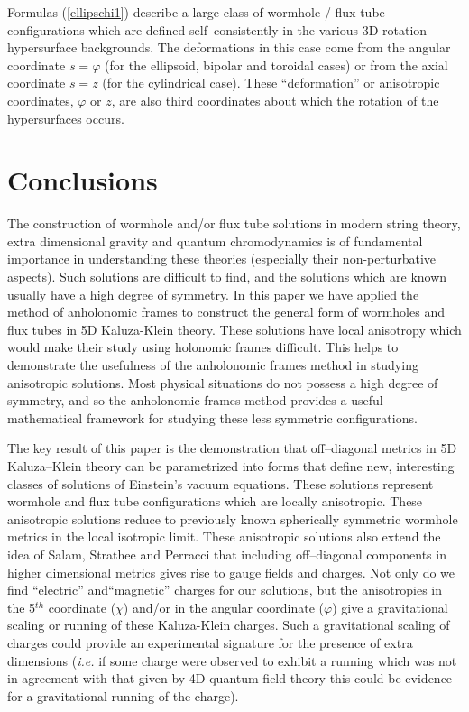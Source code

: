 \documentclass[a4paper,preprint,prabib,aps]{revtex4}
\begin{document}
Formulas (\ref{ellipschi1}) describe a large class of wormhole / flux tube
configurations which are defined self--consistently in the various 3D
rotation hypersurface backgrounds. The deformations in this case come from
the angular coordinate $s=\varphi$ (for the ellipsoid, bipolar and toroidal
cases) or from the axial coordinate $s=z$ (for the cylindrical case). These
``deformation'' or anisotropic coordinates, $\varphi$ or $z$, are also third
coordinates about which the rotation of the hypersurfaces occurs.

\section{Conclusions}

The construction of wormhole and/or flux tube solutions in modern string
theory, extra dimensional gravity and quantum chromodynamics is of
fundamental importance in understanding these theories (especially their
non-perturbative aspects). Such solutions are difficult to find, and the
solutions which are known usually have a high degree of symmetry. In this
paper we have applied the method of anholonomic frames to construct the
general form of wormholes and flux tubes in 5D Kaluza-Klein theory. These
solutions have local anisotropy which would make their study using holonomic
frames difficult. This helps to demonstrate the usefulness of the
anholonomic frames method in studying anisotropic solutions. Most physical
situations do not possess a high degree of symmetry, and so the anholonomic
frames method provides a useful mathematical framework for studying these
less symmetric configurations.

The key result of this paper is the demonstration that off--diagonal metrics
in 5D Kaluza--Klein theory can be parametrized into forms that define new,
interesting classes of solutions of Einstein's vacuum equations. These
solutions represent wormhole and flux tube configurations which are locally
anisotropic. These anisotropic solutions reduce to previously known
spherically symmetric wormhole metrics \cite{chodos,dzhsin,ds} in the local
isotropic limit. These anisotropic solutions also extend the idea of Salam,
Strathee and Perracci \cite{sal} that including off--diagonal components in
higher dimensional metrics gives rise to gauge fields and charges. Not only
do we find ``electric'' and``magnetic'' charges for our solutions, but the
anisotropies in the 5$^{th}$ coordinate ($\chi$) and/or in the angular
coordinate ($\varphi$) give a gravitational scaling or running of these
Kaluza-Klein charges. Such a gravitational scaling of charges could provide
an experimental signature for the presence of extra dimensions ({\it i.e.}
if some charge were observed to exhibit a running which was not in agreement
with that given by 4D quantum field theory this could be evidence for a
gravitational running of the charge).
\end{document}
